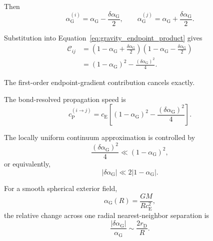 Then
\begin{equation}
    \alpha_{\mathrm{G}}^{(i)} = \alpha_{\mathrm{G}} - \frac{\delta\alpha_{\mathrm{G}}}{2}, \qquad \alpha_{\mathrm{G}}^{(j)} = \alpha_{\mathrm{G}} + \frac{\delta\alpha_{\mathrm{G}}}{2}.
\end{equation}

Substitution into Equation~\eqref{eq:gravity_endpoint_product} gives
\begin{equation}
\begin{aligned}
    \mathcal{C}_{ij} &= \left( 1-\alpha_{\mathrm{G}} + \frac{\delta\alpha_{\mathrm{G}}}{2} \right) \left( 1-\alpha_{\mathrm{G}} - \frac{\delta\alpha_{\mathrm{G}}}{2} \right) \\
    &= \left( 1-\alpha_{\mathrm{G}} \right)^2 - \frac{ \left( \delta\alpha_{\mathrm{G}} \right)^2 }{4}.
\end{aligned}
\label{eq:exact_nonuniform_factor}
\end{equation}

The first-order endpoint-gradient contribution cancels exactly.

The bond-resolved propagation speed is
\begin{equation}
    c_{\mathrm{P}}^{(i\rightarrow j)} = c_{\mathrm{E}} \left[ \left( 1-\alpha_{\mathrm{G}} \right)^2 - \frac{ \left( \delta\alpha_{\mathrm{G}} \right)^2 }{4} \right].
    \label{eq:nonuniform_bond_speed}
\end{equation}

The locally uniform continuum approximation is controlled by
\begin{equation}
    \frac{ \left( \delta\alpha_{\mathrm{G}} \right)^2 }{4} \ll \left( 1-\alpha_{\mathrm{G}} \right)^2,
\end{equation}
or equivalently,
\begin{equation}
    \left| \delta\alpha_{\mathrm{G}} \right| \ll 2 \left| 1-\alpha_{\mathrm{G}} \right|.
    \label{eq:continuum_validity_condition}
\end{equation}

For a smooth spherical exterior field,
\begin{equation}
    \alpha_{\mathrm{G}}(R) = \frac{GM}{Rc_{\mathrm{E}}^2},
\end{equation}
the relative change across one radial nearest-neighbor separation is
\begin{equation}
    \frac{ \left| \delta\alpha_{\mathrm{G}} \right| }{ \alpha_{\mathrm{G}} } \sim \frac{2r_{\mathrm{D}}}{R}.
\end{equation}

